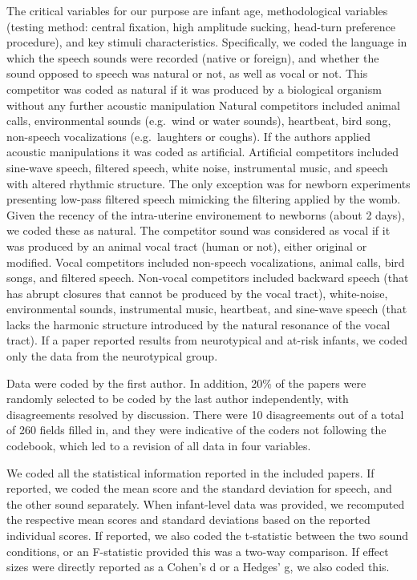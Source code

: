 \documentclass[man]{apa6}
\begin{document}
The critical variables for our purpose are infant age, methodological
variables (testing method: central fixation, high amplitude sucking,
head-turn preference procedure), and key stimuli characteristics.
Specifically, we coded the language in which the speech sounds were
recorded (native or foreign), and whether the sound opposed to speech
was natural or not, as well as vocal or not. This competitor was coded
as natural if it was produced by a biological organism without any
further acoustic manipulation Natural competitors included animal calls,
environmental sounds (e.g.~wind or water sounds), heartbeat, bird song,
non-speech vocalizations (e.g.~laughters or coughs). If the authors
applied acoustic manipulations it was coded as artificial. Artificial
competitors included sine-wave speech, filtered speech, white noise,
instrumental music, and speech with altered rhythmic structure. The only
exception was for newborn experiments presenting low-pass filtered
speech mimicking the filtering applied by the womb. Given the recency of
the intra-uterine environement to newborns (about 2 days), we coded
these as natural. The competitor sound was considered as vocal if it was
produced by an animal vocal tract (human or not), either original or
modified. Vocal competitors included non-speech vocalizations, animal
calls, bird songs, and filtered speech. Non-vocal competitors included
backward speech (that has abrupt closures that cannot be produced by the
vocal tract), white-noise, environmental sounds, instrumental music,
heartbeat, and sine-wave speech (that lacks the harmonic structure
introduced by the natural resonance of the vocal tract). If a paper
reported results from neurotypical and at-risk infants, we coded only
the data from the neurotypical group.

Data were coded by the first author. In addition, 20\% of the papers
were randomly selected to be coded by the last author independently,
with disagreements resolved by discussion. There were 10 disagreements
out of a total of 260 fields filled in, and they were indicative of the
coders not following the codebook, which led to a revision of all data
in four variables.

We coded all the statistical information reported in the included
papers. If reported, we coded the mean score and the standard deviation
for speech, and the other sound separately. When infant-level data was
provided, we recomputed the respective mean scores and standard
deviations based on the reported individual scores. If reported, we also
coded the t-statistic between the two sound conditions, or an
F-statistic provided this was a two-way comparison. If effect sizes were
directly reported as a Cohen's d or a Hedges' g, we also coded this.
\end{document}
